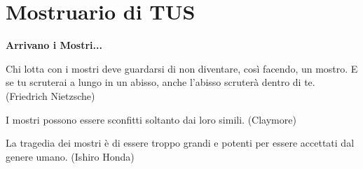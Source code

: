 %
\section{Mostruario di TUS}

\textbf{Arrivano i Mostri...}

\begin{tcolorbox}[enhanced,arc=5pt,boxrule=0.3pt]{Chi lotta con i mostri deve guardarsi di non diventare, così facendo, un mostro. E se tu scruterai a lungo in un abisso, anche l'abisso scruterà dentro di te. (Friedrich Nietzsche)
		
\medskip
		
I mostri possono essere sconfitti soltanto dai loro simili. (Claymore)

\medskip

La tragedia dei mostri è di essere troppo grandi e potenti per essere accettati dal genere umano. (Ishiro Honda)
}\end{tcolorbox}\medskip

